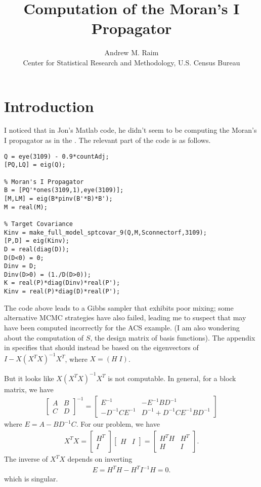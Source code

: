 \documentclass[10pt]{article}
\title{Computation of the Moran's I Propagator}
\author{Andrew M. Raim
\vspace{0.5em} \\
Center for Statistical Research and Methodology, U.S. Census Bureau
}
\begin{document}
\maketitle

\section{Introduction}
\label{sec:intro}
I noticed that in Jon's Matlab code, he didn't seem to be computing the Moran's I propagator as in the \citet{BradleyEtAl2016-STAT}. The relevant part of the code is as follows.

\begin{lstlisting}
Q = eye(3109) - 0.9*countAdj;
[PQ,LQ] = eig(Q);

% Moran's I Propagator
B = [PQ'*ones(3109,1),eye(3109)];
[M,LM] = eig(B*pinv(B'*B)*B');
M = real(M);

% Target Covariance
Kinv = make_full_model_sptcovar_9(Q,M,Sconnectorf,3109);
[P,D] = eig(Kinv);
D = real(diag(D));
D(D<0) = 0;
Dinv = D;
Dinv(D>0) = (1./D(D>0));
K = real(P)*diag(Dinv)*real(P');
Kinv = real(P)*diag(D)*real(P');
\end{lstlisting}
%
The code above leads to a Gibbs sampler that exhibits poor mixing; some alternative MCMC strategies have also failed, leading me to suspect that  may have been computed incorrectly for the ACS example. (I am also wondering about the computation of $S$, the design matrix of basis functions). The appendix in \citet{BradleyEtAl2016-STAT} specifies that  should instead be based on the eigenvectors of $I - X(X^T X)^{-1} X^T$, where $X = (H \; I)$. 


But it looks like $X(X^T X)^{-1} X^T$ is not computable. In general, for a block matrix, we have
%
\begin{align*}
\begin{bmatrix}
A & B \\
C & D
\end{bmatrix}^{-1}
=
\begin{bmatrix}
E^{-1} & -E^{-1} B D^{-1} \\
-D^{-1} C E^{-1} & D^{-1} + D^{-1} C E^{-1} B D^{-1}
\end{bmatrix}
\end{align*}
%
where $E = A - B D^{-1} C$. For our problem, we have
%
\begin{align*}
X^T X =
\begin{bmatrix}
H^T \\
I
\end{bmatrix}
\begin{bmatrix}
H & I
\end{bmatrix}
=
\begin{bmatrix}
H^T H & H^T \\
H & I
\end{bmatrix}.
\end{align*}
%
The inverse of $X^T X$ depends on inverting
%
\begin{align*}
E = H^T H - H^T I^{-1} H = 0.
\end{align*}
%
which is singular.



%
\end{document}

